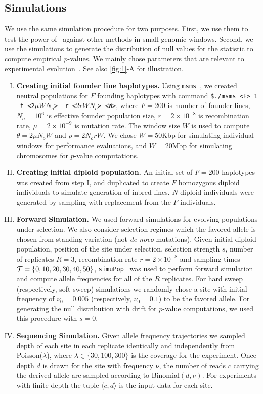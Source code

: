 \subsection{Simulations}\label{sec:sims}
We use the same simulation procedure for two purposes. First, we use
them to test the power of \comale\ against other methods in small
genomic windows. Second, we use the simulations to generate the
distribution of null values for the statistic to compute empirical
$p$-values. We mainly chose parameters that are relevant to \dmel
experimental evolution~\cite{kofler2013guide}. See also \ref{fig:1}-A
for illustration. 
\begin{enumerate}[I.]
\item {\bf Creating initial founder line haplotypes.} Using
  \texttt{msms}~\cite{ewing2010msms}, we created neutral populations
  for $F$ founding haplotypes with command \texttt{\$./msms <F> 1 -t
    <2$\mu WN_o$> -r <$2rWN_o$> <W>}, where $F=200$ is number of 
    founder
  lines, $N_o=10^6$ is effective founder population size,
  $r=2\times10^{-8}$ is recombination rate, $\mu=2\times 10^{-9}$ is
  mutation rate. The window size $W$ is used to compute $\theta=2\mu
  N_oW$ and $\rho=2N_orW$. We chose $W=50$Kbp for simulating
  individual windows for performance evaluations, and $W=20$Mbp for
  simulating \dmel chromosomes for $p$-value computations.
  
\item{\bf Creating initial diploid population.} An initial set of
  $F=200$ haplotypes was created from step I, and duplicated to create
  $F$ homozygous diploid individuals to simulate generation of inbred
  lines. $N$ diploid individuals were generated by sampling with
  replacement from the $F$ individuals.

\item{\bf Forward Simulation.} We used forward simulations for
  evolving populations under selection. We also consider selection
  regimes which the favored allele is chosen from standing variation
  (not \emph{de novo} mutations). Given initial diploid population,
  position of the site under selection, selection strength $s$, number
  of replicates $R=3$, recombination rate $r=2\times10^{-8}$ and
  sampling times ${\cal T}=\{0,10,20,30,40,50\}$,
  \texttt{simuPop}~\cite{peng2005simupop} was used to perform forward
  simulation and compute allele frequencies for all of the $R$
  replicates.  For hard sweep (respectively, soft sweep) simulations
  we randomly chose a site with initial frequency of $\nu_0=0.005$
  (respectively, $\nu_0=0.1$) to be the favored allele. For generating
  the null distribution with drift for $p$-value computations, we used
  this procedure with $s=0$.

\item{\bf Sequencing Simulation.} Given allele frequency trajectories
  we sampled depth of each site in each replicate identically and
  independently from Poisson($\lambda$), where $\lambda \in
  \{30,100,300\}$ is the coverage for the experiment. Once depth $d$
  is drawn for the site with frequency $\nu$, the number of reads $c$
  carrying the derived allele are sampled according to
  Binomial$(d,\nu)$. For experiments with finite depth the tuple
  $\langle c,d\rangle$ is the input data for each site.
\end{enumerate}
